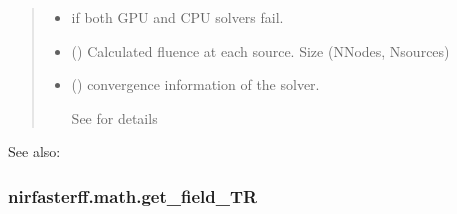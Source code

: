 \documentclass[letterpaper,10pt,english]{sphinxmanual}
\begin{document}
\begin{fulllineitems}
\begin{quote}
\begin{description}
\begin{itemize}
\item {} 
\sphinxAtStartPar
{} \textendash{} if both GPU and CPU solvers fail.

\end{itemize}

\sphinxAtStartPar
\begin{itemize}
\item {} 
\sphinxAtStartPar
{} () \textendash{} Calculated fluence at each source. Size (NNodes, Nsources)

\item {} 
\sphinxAtStartPar
{} () \textendash{} convergence information of the solver.

\sphinxAtStartPar
See {\hyperref[\detokenize{_autosummary/nirfasterff.utils.ConvergenceInfo:nirfasterff.utils.ConvergenceInfo}]{}} for details

\end{itemize}


\end{description}\end{quote}


\begin{sphinxseealso}{See also:}

\sphinxAtStartPar
{\hyperref[\detokenize{_autosummary/nirfasterff.math.gen_mass_matrix:nirfasterff.math.gen_mass_matrix}]{}}


\end{sphinxseealso}


\end{fulllineitems}


\sphinxstepscope


\subsubsection{nirfasterff.math.get\_field\_TR}
\label{\detokenize{_autosummary/nirfasterff.math.get_field_TR:nirfasterff-math-get-field-tr}}\label{\detokenize{_autosummary/nirfasterff.math.get_field_TR::doc}}
\end{document}
